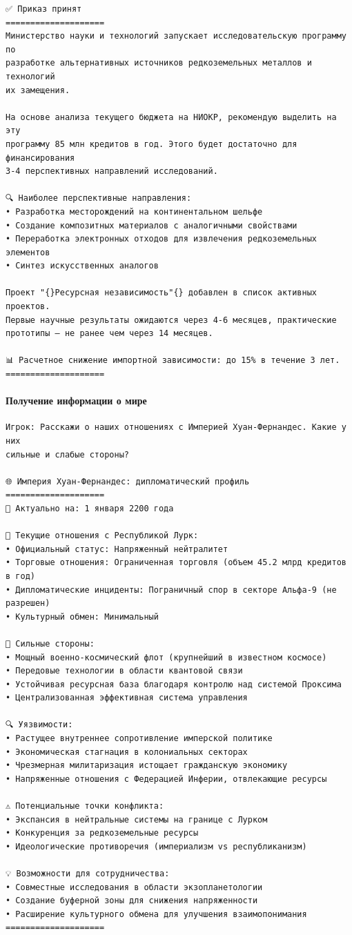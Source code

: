 \begin{verbatim}
✅ Приказ принят
====================
Министерство науки и технологий запускает исследовательскую программу по
разработке альтернативных источников редкоземельных металлов и технологий
их замещения.

На основе анализа текущего бюджета на НИОКР, рекомендую выделить на эту
программу 85 млн кредитов в год. Этого будет достаточно для финансирования
3-4 перспективных направлений исследований.

🔍 Наиболее перспективные направления:
• Разработка месторождений на континентальном шельфе
• Создание композитных материалов с аналогичными свойствами
• Переработка электронных отходов для извлечения редкоземельных элементов
• Синтез искусственных аналогов

Проект "{}Ресурсная независимость"{} добавлен в список активных проектов.
Первые научные результаты ожидаются через 4-6 месяцев, практические
прототипы — не ранее чем через 14 месяцев.

📊 Расчетное снижение импортной зависимости: до 15% в течение 3 лет.
====================
\end{verbatim}

\paragraph{Получение информации о мире}

\begin{verbatim}
Игрок: Расскажи о наших отношениях с Империей Хуан-Фернандес. Какие у них
сильные и слабые стороны?

🌐 Империя Хуан-Фернандес: дипломатический профиль
====================
📅 Актуально на: 1 января 2200 года

🤝 Текущие отношения с Республикой Лурк:
• Официальный статус: Напряженный нейтралитет
• Торговые отношения: Ограниченная торговля (объем 45.2 млрд кредитов в год)
• Дипломатические инциденты: Пограничный спор в секторе Альфа-9 (не разрешен)
• Культурный обмен: Минимальный

💪 Сильные стороны:
• Мощный военно-космический флот (крупнейший в известном космосе)
• Передовые технологии в области квантовой связи
• Устойчивая ресурсная база благодаря контролю над системой Проксима
• Централизованная эффективная система управления

🔍 Уязвимости:
• Растущее внутреннее сопротивление имперской политике
• Экономическая стагнация в колониальных секторах
• Чрезмерная милитаризация истощает гражданскую экономику
• Напряженные отношения с Федерацией Инферии, отвлекающие ресурсы

⚠️ Потенциальные точки конфликта:
• Экспансия в нейтральные системы на границе с Лурком
• Конкуренция за редкоземельные ресурсы
• Идеологические противоречия (империализм vs республиканизм)

💡 Возможности для сотрудничества:
• Совместные исследования в области экзопланетологии
• Создание буферной зоны для снижения напряженности
• Расширение культурного обмена для улучшения взаимопонимания
====================
\end{verbatim}

